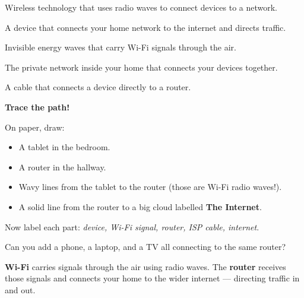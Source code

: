 \sectionrule

\begin{newwords}
  \begin{description}[labelwidth=3.2cm, leftmargin=3.4cm]
    \item[\term{Wi-Fi}]         Wireless technology that uses radio waves to connect devices to a network.
    \item[\term{Router}]        A device that connects your home network to the internet and directs traffic.
    \item[\term{Radio waves}]   Invisible energy waves that carry Wi-Fi signals through the air.
    \item[\term{Local network}] The private network inside your home that connects your devices together.
    \item[\term{Ethernet}]      A cable that connects a device directly to a router.
  \end{description}
\end{newwords}

\sectionrule

\begin{tryit}
  \textbf{Trace the path!}

  On paper, draw:
  \begin{itemize}
    \item A tablet in the bedroom.
    \item A router in the hallway.
    \item Wavy lines from the tablet to the router (those are Wi-Fi radio waves!).
    \item A solid line from the router to a big cloud labelled \textbf{The Internet}.
  \end{itemize}

  Now label each part:
  \emph{device, Wi-Fi signal, router, ISP cable, internet}.

  Can you add a phone, a laptop, and a TV all connecting to the same router?
\end{tryit}

\sectionrule

\begin{bigidea}
  \textbf{Wi-Fi} carries signals through the air using radio waves.
  The \textbf{router} receives those signals and connects your home
  to the wider internet — directing traffic in and out.
\end{bigidea}

